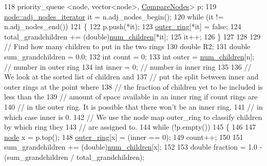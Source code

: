 \begin{DoxyCode}
118             priority\_queue <node, vector<node>, \mbox{\hyperlink{class_compare_nodes}{CompareNodes}}> p;
119             \mbox{\hyperlink{classnode_a392f19ea6dfa344bdf5c4d5a4b25eb8c}{node::adj\_nodes\_iterator}} it = n.adj\_nodes\_begin();
120             \textcolor{keywordflow}{while} (it != n.adj\_nodes\_end())
121             \{
122                 p.push(*it);
123                 \mbox{\hyperlink{rings_8cpp_a2813a60dd1c26fe13eb1970f25012d8c}{outer\_ring}}[*it] = \textcolor{keyword}{false};
124                 total\_grandchildren += (double)\mbox{\hyperlink{rings_8cpp_a021486f59a5a82e4020e5f4ce19b57a9}{num\_children}}[*it];
125                 it++;
126             \}
127             
128             
129             \textcolor{comment}{// Find how many children to put in the two rings}
130             \textcolor{keywordtype}{double} R2;
131             \textcolor{keywordtype}{double} sum\_grandchildren = 0.0;
132             \textcolor{keywordtype}{int} count = 0;
133             \textcolor{keywordtype}{int} outer = \mbox{\hyperlink{rings_8cpp_a021486f59a5a82e4020e5f4ce19b57a9}{num\_children}}[n];    \textcolor{comment}{// number in outer ring}
134             \textcolor{keywordtype}{int} inner = 0;                  \textcolor{comment}{// number in inner ring}
135             
136             \textcolor{comment}{// We look at the sorted list of children and}
137             \textcolor{comment}{// put the split between inner and outer rings at the point where}
138             \textcolor{comment}{// the fraction of children yet to be included is less than the}
139             \textcolor{comment}{// amount of space available in an inner ring if count rings are}
140             \textcolor{comment}{// in the outer ring. It is possible that there won't be an inner ring,}
141             \textcolor{comment}{// in which case inner is 0.}
142             \textcolor{comment}{// We use the node map outer\_ring to classify children by which ring they}
143             \textcolor{comment}{// are assigned to. }
144             \textcolor{keywordflow}{while} (!p.empty())
145             \{
146 
147                 \mbox{\hyperlink{classnode}{node}} x = p.top();
148                 \mbox{\hyperlink{rings_8cpp_a2813a60dd1c26fe13eb1970f25012d8c}{outer\_ring}}[x] = (inner == 0);
149                 count++;
150                 
151                 sum\_grandchildren += (double)\mbox{\hyperlink{rings_8cpp_a021486f59a5a82e4020e5f4ce19b57a9}{num\_children}}[x];
152                 
153                 \textcolor{keywordtype}{double} fraction = 1.0 - (sum\_grandchildren / total\_grandchildren);

\end{DoxyCode}
